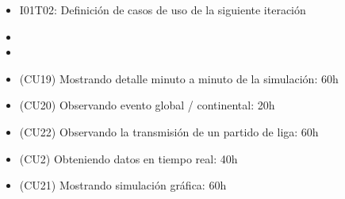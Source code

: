\begin{itemize}
  
\item I01T02: Definición de casos de uso de la siguiente iteración
\item
\item
\item (CU19) Mostrando detalle minuto a minuto de la simulación: 60h
\item (CU20) Observando evento global / continental: 20h
\item (CU22) Observando la transmisión de un partido de liga: 60h
\item (CU2)  Obteniendo datos en tiempo real: 40h
\item (CU21) Mostrando simulación gráfica: 60h
\end{itemize}
